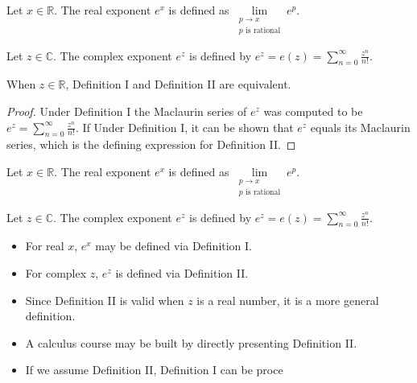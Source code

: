 \begin{frame}
\begin{definition}
Let $x\in \mathbb R$. The real exponent $e^x$ is defined as $\displaystyle \lim\limits_{\substack{p\to x \\ p\text{ is rational}}} e^p$.
\end{definition}

\begin{definition}
Let $z\in \mathbb C$. The complex exponent $e^z$ is defined by $\displaystyle e^z=e(z)= \sum\limits_{n=0}^\infty \frac{z^n}{n!}.$
\end{definition}

\end{frame}

\begin{frame}
\begin{theorem}
When $z\in \mathbb R$, Definition I and Definition II are equivalent.
\end{theorem}
\begin{proof}
Under Definition I the Maclaurin series of $e^z$ was computed to be $e^z=\sum\limits_{n=0}^\infty \frac{z^n}{n!}$. If Under Definition I, it can be shown that $e^z$ equals its Maclaurin series, which is the defining expression for Definition II.
\end{proof}
\end{frame}

\begin{frame}
\begin{definition}
Let $x\in \mathbb R$. The real exponent $e^x$ is defined as $\displaystyle \lim\limits_{\substack{p\to x \\ p\text{ is rational}}} e^p$.
\end{definition}

\begin{definition}
Let $z\in \mathbb C$. The complex exponent $e^z$ is defined by $\displaystyle e^z=e(z)= \sum\limits_{n=0}^\infty \frac{z^n}{n!}.$
\end{definition}

\begin{itemize}
\item For real $x$, $e^x$ may be defined via Definition I. 
\item For complex $z$, $e^z$ is defined via Definition II. 
\item Since Definition II is valid when $z$ is a real number, it is a more general definition.
\item A calculus course may be built by directly presenting Definition II. 
\item If we assume Definition II, Definition I can be proce
\end{itemize}

\vskip 10cm

\end{frame}